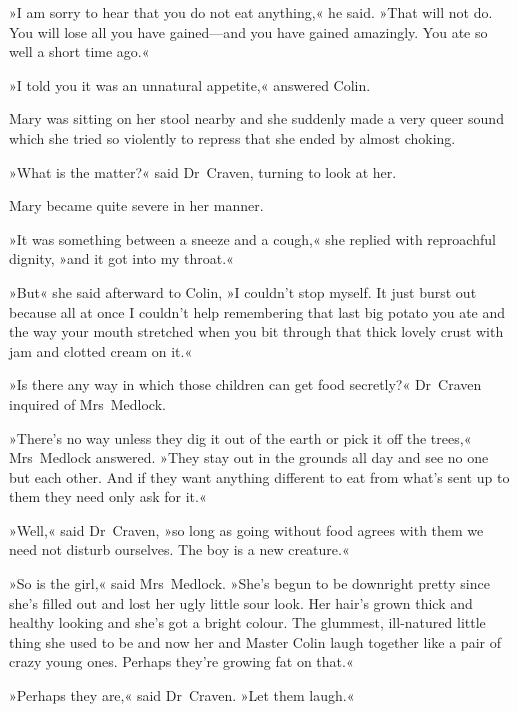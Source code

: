 »I am sorry to hear that you do not eat anything,« he said. »That will not do. You will lose all you have gained—and you have gained amazingly. You ate so well a short time ago.«

»I told you it was an unnatural appetite,« answered Colin.

Mary was sitting on her stool nearby and she suddenly made a very queer sound which she tried so violently to repress that she ended by almost choking.

»What is the matter?« said Dr~Craven, turning to look at her.

Mary became quite severe in her manner.

»It was something between a sneeze and a cough,« she replied with reproachful dignity, »and it got into my throat.«

»But« she said afterward to Colin, »I couldn't stop myself. It just burst out because all at once I couldn't help remembering that last big potato you ate and the way your mouth stretched when you bit through that thick lovely crust with jam and clotted cream on it.«

»Is there any way in which those children can get food secretly?« Dr~Craven inquired of Mrs~Medlock.

»There's no way unless they dig it out of the earth or pick it off the trees,« Mrs~Medlock answered. »They stay out in the grounds all day and see no one but each other. And if they want anything different to eat from what's sent up to them they need only ask for it.«

»Well,« said Dr~Craven, »so long as going without food agrees with them we need not disturb ourselves. The boy is a new creature.«

»So is the girl,« said Mrs~Medlock. »She's begun to be downright pretty since she's filled out and lost her ugly little sour look. Her hair's grown thick and healthy looking and she's got a bright colour. The glummest, ill-natured little thing she used to be and now her and Master Colin laugh together like a pair of crazy young ones. Perhaps they're growing fat on that.«

»Perhaps they are,« said Dr~Craven. »Let them laugh.«